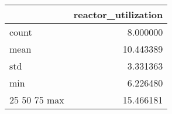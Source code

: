 \begin{tabular}{lr}
\toprule
 & reactor\_utilization \\
\midrule
count & 8.000000 \\
mean & 10.443389 \\
std & 3.331363 \\
min & 6.226480 \\
25%
50%
75%
max & 15.466181 \\
\bottomrule
\end{tabular}

